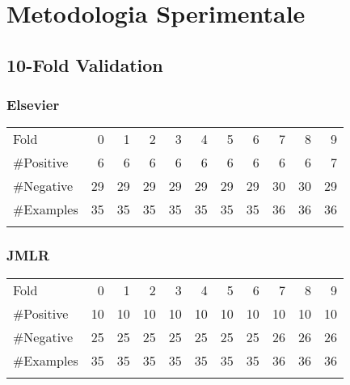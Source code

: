 \section{Metodologia Sperimentale}


\subsection{10-Fold Validation}

\subsubsection{Elsevier}

\begin{table}[htbp]
	\centering
		\begin{tabular}{l@{\qquad}*{10}{r}}
		\toprule
\addlinespace
			Fold &  0 &  1 &  2 &  3 &  4 &  5 &  6 &  7 &  8 &  9 \\
\addlinespace
\midrule
\addlinespace
\#Positive  & 6  & 6  &  6 &  6 &  6 &  6 &  6 &  6 &  6 &  7 \\
\#Negative  & 29 & 29 & 29 & 29 & 29 & 29 & 29 & 30 & 30 & 29 \\
\#Examples & 35 & 35 & 35 & 35 & 35 & 35 & 35 & 36 & 36 & 36 \\
\addlinespace
\bottomrule
		\end{tabular}
	\label{tab:Elsevier}
\end{table}


\subsubsection{JMLR}

\begin{table}
\centering
\begin{tabular}{l@{\qquad}*{10}{r}}
		\toprule
\addlinespace
Fold &  0 &  1 &  2 &  3 &  4 &  5 &  6 &  7 &  8 &  9 \\
\addlinespace
\midrule
\addlinespace
\#Positive  & 10  & 10  &  10 &  10 &  10 &  10 &  10 &  10 &  10 &  10 \\
\#Negative  & 25 & 25 & 25 & 25 & 25 & 25 & 25 & 26 & 26 & 26 \\
\#Examples  & 35 & 35 & 35 & 35 & 35 & 35 & 35 & 36 & 36 & 36 \\
\addlinespace
\bottomrule
\end{tabular}
	\label{tab:JMLR}
\end{table}



